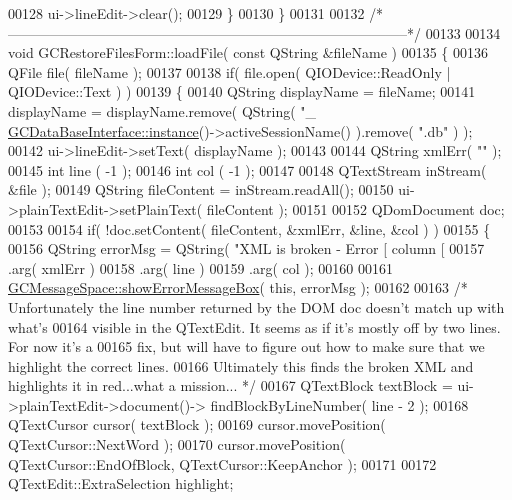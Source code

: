 \begin{DoxyCode}
{00128     ui->lineEdit->clear();
00129   \}
00130 \}
00131 
00132 \textcolor{comment}{/*
      --------------------------------------------------------------------------------------*/}
00133 
00134 \textcolor{keywordtype}{void} GCRestoreFilesForm::loadFile( \textcolor{keyword}{const} QString &fileName )
00135 \{
00136   QFile file( fileName );
00137 
00138   \textcolor{keywordflow}{if}( file.open( QIODevice::ReadOnly | QIODevice::Text ) )
00139   \{
00140     QString displayName = fileName;
00141     displayName = displayName.remove( QString( \textcolor{stringliteral}{"\_%
      \hyperlink{class_g_c_data_base_interface_a1baea9c0667aa8b610ec30076fcab84c}{GCDataBaseInterface::instance}()->activeSessionName() ).\textcolor{keyword}{remove}( \textcolor{stringliteral}{".db"} ) );
00142     ui->lineEdit->setText( displayName );
00143 
00144     QString xmlErr( \textcolor{stringliteral}{""} );
00145     \textcolor{keywordtype}{int}     line  ( -1 );
00146     \textcolor{keywordtype}{int}     col   ( -1 );
00147 
00148     QTextStream inStream( &file );
00149     QString fileContent = inStream.readAll();
00150     ui->plainTextEdit->setPlainText( fileContent );
00151 
00152     QDomDocument doc;
00153 
00154     \textcolor{keywordflow}{if}( !doc.setContent( fileContent, &xmlErr, &line, &col ) )
00155     \{
00156       QString errorMsg = QString( \textcolor{stringliteral}{"XML is broken - Error [%
       column [%
00157                          .arg( xmlErr )
00158                          .arg( line )
00159                          .arg( col );
00160 
00161       \hyperlink{namespace_g_c_message_space_ab118b3a133686167617eb955029fd44e}{GCMessageSpace::showErrorMessageBox}( \textcolor{keyword}{this}, errorMsg );
00162 
00163       \textcolor{comment}{/* Unfortunately the line number returned by the DOM doc doesn't match up
       with what's}
00164 \textcolor{comment}{        visible in the QTextEdit.  It seems as if it's mostly off by two lines.
        For now it's a}
00165 \textcolor{comment}{        fix, but will have to figure out how to make sure that we highlight the
       correct lines.}
00166 \textcolor{comment}{        Ultimately this finds the broken XML and highlights it in red...what a
       mission... */}
00167       QTextBlock textBlock = ui->plainTextEdit->document()->
      findBlockByLineNumber( line - 2 );
00168       QTextCursor cursor( textBlock );
00169       cursor.movePosition( QTextCursor::NextWord );
00170       cursor.movePosition( QTextCursor::EndOfBlock, QTextCursor::KeepAnchor );
00171 
00172       QTextEdit::ExtraSelection highlight;
}}}
\end{DoxyCode}
